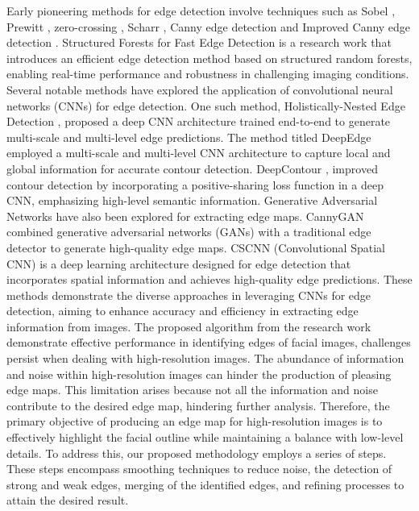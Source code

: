 \documentclass{70_styles/svproc}
\begin{document}
Early pioneering methods for edge detection involve techniques such as Sobel \cite{996}, Prewitt \cite{6100495}, zero-crossing \cite{1980} \cite{4767769}, Scharr \cite{levkine2012prewitt}, Canny edge detection \cite{4767851} and Improved Canny edge detection \cite{6885761}. Structured Forests for Fast Edge Detection \cite{6975234} is a research work that introduces an efficient edge detection method based on structured random forests, enabling real-time performance and robustness in challenging imaging conditions. Several notable methods have explored the application of convolutional neural networks (CNNs) for edge detection. One such method, Holistically-Nested Edge Detection \cite{xie2015holisticallynested}, proposed a deep CNN architecture trained end-to-end to generate multi-scale and multi-level edge predictions. The method titled DeepEdge \cite{bertasius2015deepedge} employed a multi-scale and multi-level CNN architecture to capture local and global information for accurate contour detection. DeepContour \cite{7299024}, improved contour detection by incorporating a positive-sharing loss function in a deep CNN, emphasizing high-level semantic information. Generative Adversarial Networks \cite{chen2020edge} have also been explored for extracting edge maps. CannyGAN \cite{8803828} combined generative adversarial networks (GANs) with a traditional edge detector to generate high-quality edge maps. CSCNN (Convolutional Spatial CNN) \cite{9407182} is a deep learning architecture designed for edge detection that incorporates spatial information and achieves high-quality edge predictions.
These methods demonstrate the diverse approaches in leveraging CNNs for edge detection, aiming to enhance accuracy and efficiency in extracting edge information from images. The proposed algorithm from the research work \cite{6460720} demonstrate effective performance in identifying edges of facial images, challenges persist when dealing with high-resolution images. The abundance of information and noise within high-resolution images can hinder the production of pleasing edge maps. This limitation arises because not all the information and noise contribute to the desired edge map, hindering further analysis. Therefore, the primary objective of producing an edge map for high-resolution images is to effectively highlight the facial outline while maintaining a balance with low-level details. To address this, our proposed methodology employs a series of steps. These steps encompass smoothing techniques to reduce noise, the detection of strong and weak edges, merging of the identified edges, and refining processes to attain the desired result. 
\end{document}
